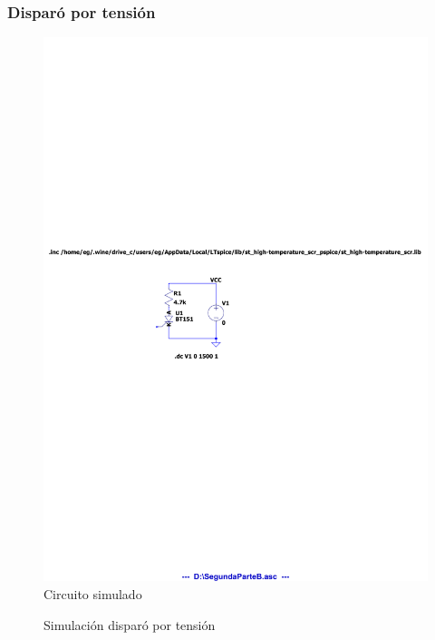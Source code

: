 \subsubsection{Disparó por tensión}
\begin{figure}[H]
  \begin{center}
    \includegraphics[width=0.5\linewidth, clip, trim=5cm 12cm 10cm 12cm]{inc/sim/SegundaParteB.pdf}
  \end{center}
  \caption{Circuito simulado}
  \label{fig:CircuitoSegundaParte}
\end{figure}
\begin{figure}[H]
\begin{center}
  \caption{Simulación disparó por tensión}
\end{center}
\end{figure}

